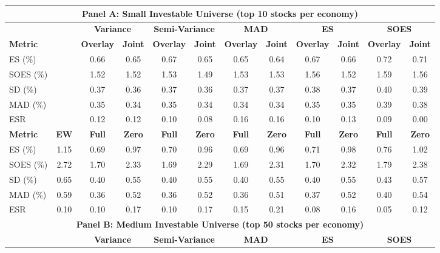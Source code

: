   \begin{tabular}{l*{11}{c}}
    \toprule
    \multicolumn{12}{c}{\textbf{Panel A: Small Investable Universe (top 10 stocks per economy)}} \\
    \midrule
    & & \multicolumn{2}{c}{\textbf{Variance}} & \multicolumn{2}{c}{\textbf{Semi-Variance}} & \multicolumn{2}{c}{\textbf{MAD}} & \multicolumn{2}{c}{\textbf{ES}} & \multicolumn{2}{c}{\textbf{SOES}} \\
    \cmidrule(lr){3-4} \cmidrule(lr){5-6} \cmidrule(lr){7-8} \cmidrule(lr){9-10} \cmidrule(lr){11-12}
    \textbf{Metric} &  & \textbf{Overlay} & \textbf{Joint} & \textbf{Overlay} & \textbf{Joint} & \textbf{Overlay} & \textbf{Joint} & \textbf{Overlay} & \textbf{Joint} & \textbf{Overlay} & \textbf{Joint} \\
    \midrule
    ES (\%) &  & 0.66 & 0.65 & 0.67 & 0.65 & 0.65 & 0.64 & 0.67 & 0.66 & 0.72 & 0.71 \\
    SOES (\%) &  & 1.52 & 1.52 & 1.53 & 1.49 & 1.53 & 1.53 & 1.56 & 1.52 & 1.59 & 1.56 \\
    SD (\%) &  & 0.37 & 0.36 & 0.37 & 0.36 & 0.37 & 0.37 & 0.38 & 0.37 & 0.40 & 0.39 \\
    MAD (\%) &  & 0.35 & 0.34 & 0.35 & 0.34 & 0.34 & 0.34 & 0.35 & 0.35 & 0.39 & 0.38 \\
    ESR &  & 0.12 & 0.12 & 0.10 & 0.08 & 0.16 & 0.16 & 0.10 & 0.13 & 0.09 & 0.00 \\
    \midrule
    \textbf{Metric} & \textbf{EW} & \textbf{Full} & \textbf{Zero} & \textbf{Full} & \textbf{Zero} & \textbf{Full} & \textbf{Zero} & \textbf{Full} & \textbf{Zero} & \textbf{Full} & \textbf{Zero} \\
    \midrule
    ES (\%) & 1.15 & 0.69 & 0.97 & 0.70 & 0.96 & 0.69 & 0.96 & 0.71 & 0.98 & 0.76 & 1.02 \\
    SOES (\%) & 2.72 & 1.70 & 2.33 & 1.69 & 2.29 & 1.69 & 2.31 & 1.70 & 2.32 & 1.79 & 2.38 \\
    SD (\%) & 0.65 & 0.40 & 0.55 & 0.40 & 0.55 & 0.40 & 0.55 & 0.40 & 0.55 & 0.43 & 0.57 \\
    MAD (\%) & 0.59 & 0.36 & 0.52 & 0.36 & 0.52 & 0.36 & 0.51 & 0.37 & 0.52 & 0.40 & 0.54 \\
    ESR & 0.10 & 0.10 & 0.17 & 0.10 & 0.17 & 0.15 & 0.21 & 0.08 & 0.16 & 0.05 & 0.12 \\
    \midrule
    \multicolumn{12}{c}{\textbf{Panel B: Medium Investable Universe (top 50 stocks per economy)}} \\
    \midrule
    & & \multicolumn{2}{c}{\textbf{Variance}} & \multicolumn{2}{c}{\textbf{Semi-Variance}} & \multicolumn{2}{c}{\textbf{MAD}} & \multicolumn{2}{c}{\textbf{ES}} & \multicolumn{2}{c}{\textbf{SOES}} \\

\end{tabular}

